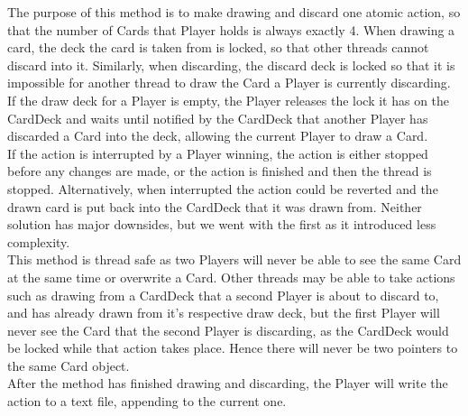 \documentclass[11p]{article}
\begin{document}
The purpose of this method is to make drawing and discard one atomic action, so that the number of Cards that Player holds is always exactly 4. When drawing a card, the deck the card is taken from is locked, so that other threads cannot discard into it. Similarly, when discarding, the discard deck is locked so that it is impossible for another thread to draw the Card a Player is currently discarding.\\
If the draw deck for a Player is empty, the Player releases the lock it has on the CardDeck and waits until notified by the CardDeck that another Player has discarded a Card into the deck, allowing the current Player to draw a Card.\\
If the action is interrupted by a Player winning, the action is either stopped before any changes are made, or the action is finished and then the thread is stopped. Alternatively, when interrupted the action could be reverted and the drawn card is put back into the CardDeck that it was drawn from. Neither solution has major downsides, but we went with the first as it introduced less complexity.\\
This method is thread safe as two Players will never be able to see the same Card at the same time or overwrite a Card. Other threads may be able to take actions such as drawing from a CardDeck that a second Player is about to discard to, and has already drawn from it's respective draw deck, but the first Player will never see the Card that the second Player is discarding, as the CardDeck would be locked while that action takes place. Hence there will never be two pointers to the same Card object.\\
After the method has finished drawing and discarding, the Player will write the action to a text file, appending to the current one.\\
\end{document}

